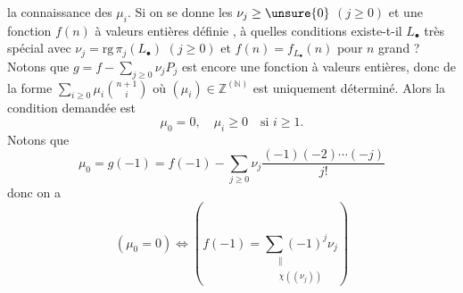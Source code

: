 la connaissance des $\mu_i$. Si on se donne les  $\nu_j\geq\unsure{0}$   $(j\geq0)$ et une fonction  $f(n)$ à valeurs entières définie  , à quelles conditions existe-t-il $L_\bullet$ très spécial avec $\nu_j=\mathrm{rg}\,\pi_j(L_\bullet)$ $(j\geq0)$ et $f(n)=f_{L_\bullet}(n)$ pour $n$ grand ? Notons que $g=f-\sum_{j\geq0}\nu_jP_j$ est encore une fonction   à valeurs entières, donc de la forme $\sum_{i\geq0}\mu_i\binom{n+1}{i}$ où $(\mu_i)\in\mathbb Z^{(\mathbb N)}$ est uniquement déterminé. Alors la condition demandée est
\[
\mu_0=0,\quad\mu_i\geq0\quad\text{si }i\geq1.
\]
Notons que 
\[
\mu_0=g(-1)=f(-1)-\sum_{j\geq0}\nu_j\frac{(-1)(-2)\cdots(-j)}{j!}
\]
donc on a 
\[
(\mu_0=0)\Longleftrightarrow\left(f(-1)=\underset{\substack{\Vert\\\chi((\nu_j))}}{\sum(-1)^j\nu_j}\right)
\]


